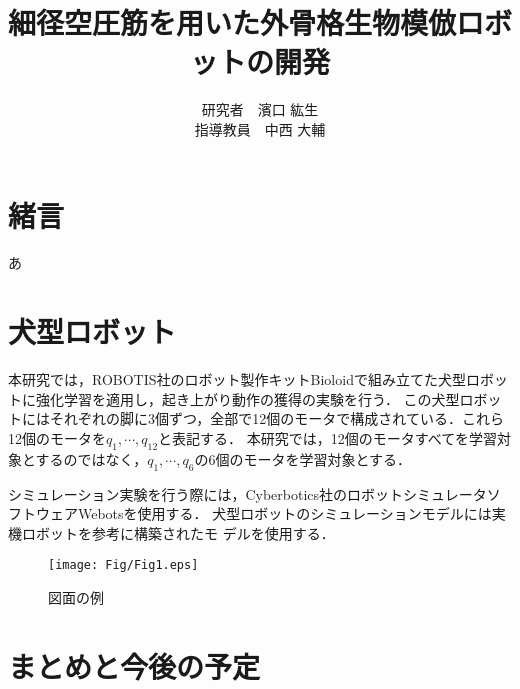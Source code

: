\documentclass{jarticle}
\begin{document}

\title{
細径空圧筋を用いた外骨格生物模倣ロボットの開発
}
\author{
研究者　濱口 紘生\\
指導教員　中西 大輔
}

\maketitle

\thispagestyle{empty}  %

\section{緒言}

あ

\vspace*{-2mm}
\section{犬型ロボット}

本研究では，ROBOTIS社のロボット製作キットBioloidで組み立てた犬型ロボットに強化学習を適用し，起き上がり動作の獲得の実験を行う．
この犬型ロボットにはそれぞれの脚に3個ずつ，全部で12個のモータで構成されている．これら12個のモータを$q_1, \cdots, q_{12}$と表記する．
本研究では，12個のモータすべてを学習対象とするのではなく，$q_1, \cdots, q_6$の6個のモータを学習対象とする．

シミュレーション実験を行う際には，Cyberbotics社のロボットシミュレータソフトウェアWebotsを使用する．
犬型ロボットのシミュレーションモデルには実機ロボットを参考に構築されたモ
デルを使用する．
\begin{figure}[!b]
  \begin{center}
   \texttt{[image: Fig/Fig1.eps]}
   \vspace*{-4mm}
   \caption{図面の例}
   \label{robot}
  \end{center}
\end{figure}
\fi
\vspace*{-2mm}
\section{まとめと今後の予定}
\end{document}
